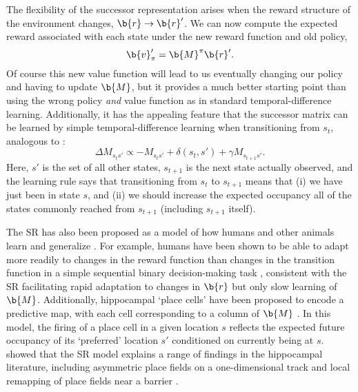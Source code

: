 The flexibility of the successor representation arises when the reward structure of the environment changes, $\b{r} \rightarrow \b{r}'$.
We can now compute the expected reward associated with each state under the new reward function and old policy,
\begin{equation}
    \b{v}_\pi' = \b{M}^\pi \b{r}'.
\end{equation}
Of course this new value function will lead to us eventually changing our policy and having to update $\b{M}$, but it provides a much better starting point than using the wrong policy \emph{and} value function as in standard temporal-difference learning.
Additionally, it has the appealing feature that the successor matrix can be learned by simple temporal-difference learning when transitioning from $s_t$, analogous to :
\begin{equation}
    \Delta M_{s_t s'} \propto -M_{s_t s'} + \delta(s_t, s') + \gamma M_{s_{t+1} s'}.
\end{equation}
Here, ${s'}$ is the set of all other states, $s_{t+1}$ is the next state actually observed, and the learning rule says that transitioning from $s_t$ to $s_{t+1}$ means that (i) we have just been in state $s$, and (ii) we should increase the expected occupancy all of the states commonly reached from $s_{t+1}$ (including $s_{t+1}$ itself).

The SR has also been proposed as a model of how humans and other animals learn and generalize \citep{momennejad2017successor, stachenfeld2017hippocampus, geerts2020general}.
For example, humans have been shown to be able to adapt more readily to changes in the reward function than changes in the transition function in a simple sequential binary decision-making task \citep{momennejad2017successor}, consistent with the SR facilitating rapid adaptation to changes in $\b{r}$ but only slow learning of $\b{M}$.
Additionally, hippocampal `place cells' have been proposed to encode a predictive map, with each cell corresponding to a column of $\b{M}$ \citep{stachenfeld2017hippocampus}.
In this model, the firing of a place cell in a given location $s$ reflects the expected future occupancy of its `preferred' location $s'$ conditioned on currently being at $s$.
\citet{stachenfeld2017hippocampus} showed that the SR model explains a range of findings in the hippocampal literature, including asymmetric place fields on a one-dimensional track \citep{mehta2000experience} and local remapping of place fields near a barrier \citep{alvernhe2011local}.

